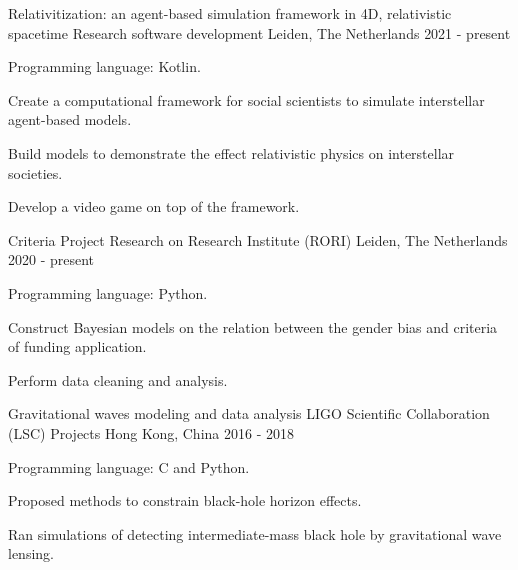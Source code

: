 

\begin{cventries}

  \cventry
    {Relativitization: an agent-based simulation framework in 4D, relativistic spacetime} %
    {Research software development} %
    {Leiden, The Netherlands} %
    {2021 - present} %
    {
      \begin{cvitems} %
        \item {Programming language: Kotlin.}
        \item {Create a computational framework for social scientists to simulate interstellar agent-based models.}
        \item {Build models to demonstrate the effect relativistic physics on interstellar societies.}
        \item {Develop a video game on top of the framework.}
      \end{cvitems}
    }

  \cventry
    {Criteria Project} %
    {Research on Research Institute (RORI)} %
    {Leiden, The Netherlands} %
    {2020 - present} %
    {
      \begin{cvitems} %
        \item {Programming language: Python.}
        \item {Construct Bayesian models on the relation between the gender bias and criteria of funding application.}
        \item {Perform data cleaning and analysis.}
      \end{cvitems}
    }

  \cventry
    {Gravitational waves modeling and data analysis} %
    {LIGO Scientific Collaboration (LSC) Projects} %
    {Hong Kong, China} %
    {2016 - 2018} %
    {
      \begin{cvitems} %
        \item {Programming language: C and Python.}
        \item {Proposed methods to constrain black-hole horizon effects.}
        \item {Ran simulations of detecting intermediate-mass black hole by gravitational wave lensing.}
      \end{cvitems}
    }


\end{cventries}
